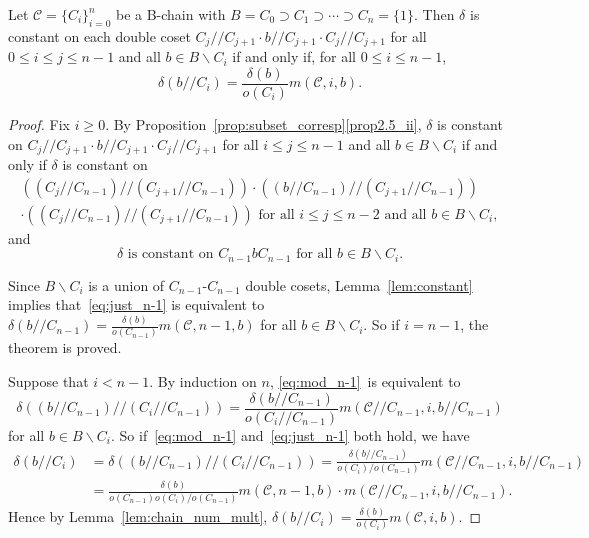 \documentclass[ALCO,ThmDefs,Unicode,epreuves]{cedram}
\begin{document}
\begin{thm}
\label{thm:constant_2coset}
Let $\mathcal{C} = \{C_i\}_{i=0}^n$ be a B-chain with $B = C_0 \supset
C_1 \supset \cdots \supset C_n = \{1\}$. Then $\delta$ is constant on
each double coset $C_j//C_{j+1}\cdot b//C_{j+1}\cdot C_j//C_{j+1}$ for
all $0 \leq i \leq j \leq n-1$ and all $b \in B\backslash C_i$ if and only if,
for all $0 \leq i \leq n-1$,
\[
\delta(b//C_i) = \frac{\delta(b)}{o(C_i)}m(\mathcal{C}, i, b).
\]
\end{thm}
 
\begin{proof}
Fix $i \geq 0$. By Proposition~\ref{prop:subset_corresp}\ref{prop2.5_ii}, $\delta$ is constant on
$C_j//C_{j+1}\cdot b//C_{j+1}\cdot C_j//C_{j+1}$ for all $i \leq j
\leq n-1$ and all $b \in B\backslash C_i$ if and only if $\delta$ is
constant on 
\begin{multline}\label{eq:mod_n-1} 
\left((C_j//C_{n-1})//(C_{j+1}//C_{n-1})\right)\cdot
\left((b//C_{n-1})//(C_{j+1}//C_{n-1})\right)
\\
\cdot
\left((C_j//C_{n-1})//(C_{j+1}//C_{n-1})\right)
\mbox{ for all }i \leq j \leq n-2 \mbox{ and all }b \in
B\backslash C_i, 
\end{multline}
and
\begin{equation}
\label{eq:just_n-1}
\delta \mbox{ is constant on } C_{n-1}bC_{n-1} \mbox{ for all }b \in
B\backslash C_i.
\end{equation} 
 
Since $B\backslash C_i$ is a union of $C_{n-1}$-$C_{n-1}$ double cosets,
Lemma~\ref{lem:constant} implies that~\eqref{eq:just_n-1} is equivalent
to $\delta(b//C_{n-1}) = \frac{\delta(b)}{o(C_{n-1})}m(\mathcal{C}, n-1,
b)$ for all $b \in B\backslash C_i$. So if $i = n-1$, the theorem is
proved. 

Suppose that $i < n-1$. By induction on $n$, \eqref{eq:mod_n-1}~is
equivalent to 
\[
\delta\left((b//C_{n-1})//(C_i//C_{n-1})\right) = 
\frac{\delta(b//C_{n-1})}{o(C_i//C_{n-1})}m(\mathcal{C}//C_{n-1}, i,
b//C_{n-1})
\]
for all $b \in B\backslash C_i$. So if~\eqref{eq:mod_n-1} and~\eqref{eq:just_n-1} both hold, we have
\[
\begin{aligned}
\delta(b//C_i) &= \delta \left((b//C_{n-1})//(C_i//C_{n-1})\right) =
\frac{\delta(b//C_{n-1})}{o(C_i)/o(C_{n-1})}m(\mathcal{C}//C_{n-1}, i,
b//C_{n-1})
\\
&= \frac{\delta(b)}{o(C_{n-1})o(C_i)/o(C_{n-1})}m(\mathcal{C}, n-1,
b)\cdot m(\mathcal{C}//C_{n-1}, i, b//C_{n-1}).
\end{aligned}
\]
Hence by Lemma~\ref{lem:chain_num_mult}, $\delta(b//C_i) =
\frac{\delta(b)}{o(C_i)}m(\mathcal{C}, i, b)$.


\end{proof}
\end{document}
